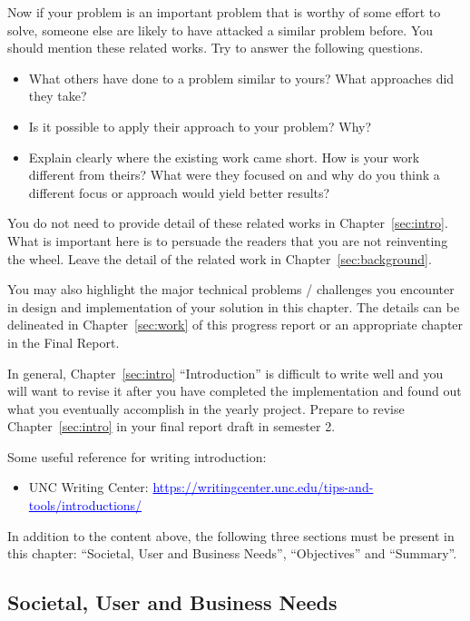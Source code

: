\documentclass[11pt,a4paper]{article}
\newcommand{\blue}[1]{\textcolor{blue}{#1}}
\begin{document}
Now if your problem is an important problem that is worthy of some effort to solve, someone else are likely to have attacked a similar problem before. You should mention these related works. Try to answer the following questions.
\begin{itemize}
  \item What others have done to a problem similar to yours? What approaches did they take?
  \item Is it possible to apply their approach to your problem? Why?
  \item Explain clearly where the existing work came short. How is your work different from theirs? What were they focused on and why do you think a different focus or approach would yield better results?
\end{itemize}

You do not need to provide detail of these related works in Chapter~\ref{sec:intro}. What is important here is to persuade the readers that you are not reinventing the wheel. Leave the detail of the related work in Chapter~\ref{sec:background}.

You may also highlight the major technical problems / challenges you encounter in design and implementation of your solution in this chapter. The details can be delineated in Chapter~\ref{sec:work} of this progress report or an appropriate chapter in the Final Report.

In general, Chapter~\ref{sec:intro} ``Introduction'' is difficult to write well and you will want to revise it after you have completed the implementation and found out what you eventually accomplish in the yearly project. Prepare to revise Chapter~\ref{sec:intro} in your final report draft in semester 2.

Some useful reference for writing introduction:
\begin{itemize}
  \item UNC Writing Center: \blue{\uline{https://writingcenter.unc.edu/tips-and-tools/introductions/}}
\end{itemize}

In addition to the content above, the following three sections must be present in this chapter: ``Societal, User and Business Needs'', ``Objectives'' and ``Summary''.

\subsection{Societal, User and Business Needs}
\end{document}
